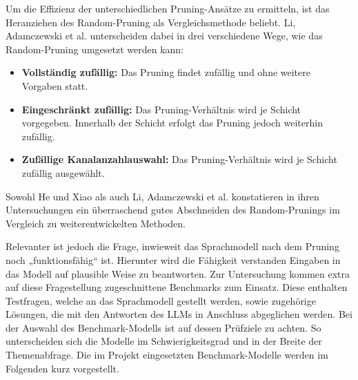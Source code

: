 Um die Effizienz der unterschiedlichen Pruning-Ansätze zu ermitteln, ist das
Heranziehen des Random-Pruning als Vergleichsmethode beliebt. Li, Adamczewski
et al. unterscheiden dabei in drei verschiedene Wege, wie das Random-Pruning
umgesetzt werden kann:

\begin{itemize}
	\item \textbf{Vollständig zufällig:} Das Pruning findet zufällig und ohne weitere Vorgaben statt.
	\item \textbf{Eingeschränkt zufällig:} Das Pruning-Verhältnis wird je Schicht vorgegeben. Innerhalb der Schicht erfolgt das Pruning jedoch weiterhin zufällig.
	\item \textbf{Zufällige Kanalanzahlauswahl:} Das Pruning-Verhältnis wird je Schicht zufällig ausgewählt.\autocite[Vgl.][]{li2022random}
\end{itemize}

Sowohl He und Xiao als auch Li, Adamczewski et al. konstatieren in ihren
Untersuchungen ein überraschend gutes Abschneiden des Random-Prunings im
Vergleich zu weiterentwickelten Methoden.\autocites[Vgl.][]{he2023structured}{li2022random}

Relevanter ist jedoch die Frage, inwieweit das Sprachmodell nach dem Pruning
noch „funktionsfähig“ ist. Hierunter wird die Fähigkeit verstanden Eingaben in
das Modell auf plausible Weise zu beantworten. Zur Untersuchung kommen extra
auf diese Fragestellung zugeschnittene Benchmarks zum Einsatz. Diese enthalten
Testfragen, welche an das Sprachmodell gestellt werden, sowie zugehörige
Lösungen, die mit den Antworten des LLMs in Anschluss abgeglichen werden. Bei
der Auswahl des Benchmark-Modells ist auf dessen Prüfziele zu achten. So
unterscheiden sich die Modelle im Schwierigkeitsgrad und in der Breite der
Themenabfrage. Die im Projekt eingesetzten Benchmark-Modelle werden im
Folgenden kurz vorgestellt.


